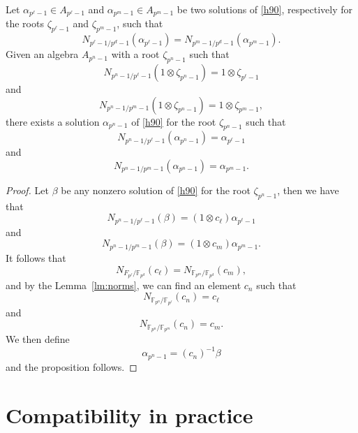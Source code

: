 \documentclass[a4paper,11pt]{article}
\begin{document}
\begin{prop}
  Let $\alpha_{p^\ell-1}\in A_{p^\ell-1}$ and $\alpha_{p^m-1}\in A_{p^m-1}$ be
  two solutions of \eqref{h90}, respectively for the roots $\zeta_{p^\ell-1}$ and
  $\zeta_{p^m-1}$, such that
  \[
    N_{p^\ell-1/p^d-1}(\alpha_{p^\ell-1})=N_{p^m-1/p^d-1}(\alpha_{p^m-1}).
  \]
  Given an algebra $A_{p^n-1}$ with a root $\zeta_{p^n-1}$ such that 
  \[
    N_{p^n-1/p^\ell-1}(1\otimes\zeta_{p^n-1})=1\otimes\zeta_{p^\ell-1}
  \]
  and
  \[
    N_{p^n-1/p^m-1}(1\otimes\zeta_{p^n-1})=1\otimes\zeta_{p^m-1},
  \]
  there exists a solution $\alpha_{p^n-1}$ of \eqref{h90} for the root $\zeta_{p^n-1}$ such that
  \[
    N_{p^n-1/p^\ell-1}(\alpha_{p^n-1})=\alpha_{p^\ell-1}
  \]
  and
  \[
    N_{p^n-1/p^m-1}(\alpha_{p^n-1})=\alpha_{p^m-1}.
  \]
\end{prop}
\begin{proof}
  Let $\beta$ be any nonzero solution of \eqref{h90} for the root
  $\zeta_{p^n-1}$, then we have that
  \[
    N_{p^n-1/p^\ell-1}(\beta)=(1\otimes c_\ell)\alpha_{p^\ell-1}
  \]
  and
  \[
    N_{p^n-1/p^m-1}(\beta)=(1\otimes c_m)\alpha_{p^m-1}.
  \]
  It follows that 
  \[
    N_{F_{p^\ell}/\mathbb{F}_{p^d}}(c_\ell)=N_{\mathbb{F}_{p^m}/\mathbb{F}_{p^d}}(c_m),
  \]
  and by the Lemma~\ref{lm:norms}, we can find an element $c_n$ such that
  \[
    N_{\mathbb{F}_{p^n}/\mathbb{F}_{p^\ell}}(c_n) = c_\ell
  \]
  and
  \[
    N_{\mathbb{F}_{p^n}/\mathbb{F}_{p^m}}(c_n)=c_m.
  \]
 We then define 
 \[
   \alpha_{p^n-1}=(c_n)^{-1}\beta
 \]
 and the proposition follows.

\end{proof}

\section{Compatibility in practice}
\label{sec:practice}
\end{document}
